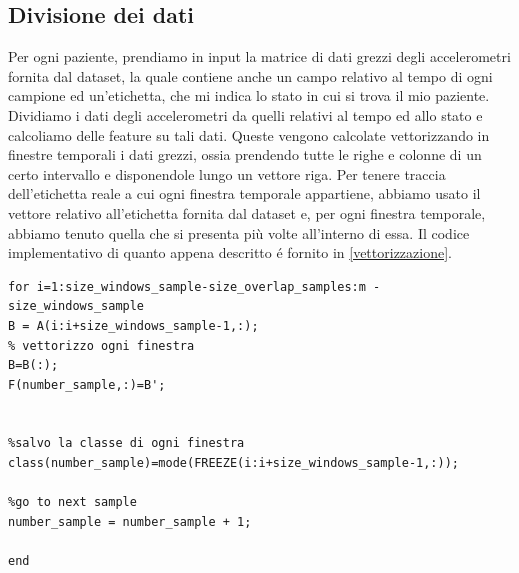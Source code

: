 \subsection{Divisione dei dati}
Per ogni paziente, prendiamo in input la matrice di dati grezzi degli accelerometri fornita dal dataset, la quale contiene anche un campo relativo al tempo di ogni campione ed un'etichetta, che mi indica lo stato in cui si trova il mio paziente. Dividiamo i dati degli accelerometri da quelli relativi al tempo ed allo stato e calcoliamo delle feature su tali dati. Queste vengono calcolate vettorizzando in  finestre temporali i dati grezzi, ossia prendendo tutte le righe e colonne di un certo intervallo e disponendole lungo un vettore riga. Per tenere traccia dell'etichetta reale a cui ogni finestra temporale appartiene, abbiamo usato il vettore relativo all'etichetta fornita dal dataset e, per ogni finestra temporale, abbiamo tenuto quella che si presenta più volte all'interno di essa. Il codice implementativo di quanto appena descritto é fornito in \ref{vettorizzazione}.
\begin{lstlisting}[style=Matlab-editor,frame=single, caption=Vettorizzazione dei dati degli accelerometri, label=vettorizzazione]
for i=1:size_windows_sample-size_overlap_samples:m - size_windows_sample
B = A(i:i+size_windows_sample-1,:);
% vettorizzo ogni finestra
B=B(:);
F(number_sample,:)=B';


%salvo la classe di ogni finestra
class(number_sample)=mode(FREEZE(i:i+size_windows_sample-1,:));

%go to next sample
number_sample = number_sample + 1;

end
\end{lstlisting}

